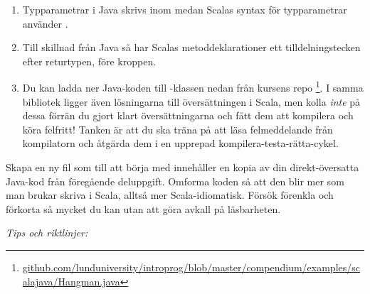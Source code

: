 \begin{enumerate}[noitemsep]
\item Typparametrar i Java skrivs inom \code{<>} medan Scalas syntax för typparametrar använder \code{[]}.

\item Till skillnad från Java så har Scalas metoddeklarationer ett tilldelningstecken \code{=} efter returtypen, före kroppen.

\item Du kan ladda ner Java-koden till -klassen nedan från kursens repo%
\footnote{\href{https://github.com/lunduniversity/introprog/blob/master/compendium/examples/scalajava/Hangman.java}{github.com/lunduniversity/introprog/blob/master/compendium/examples/scalajava/Hangman.java}}. I samma bibliotek ligger även lösningarna till översättningen i Scala, men kolla \emph{inte} på dessa förrän du gjort klart översättningarna och fått dem att kompilera och köra felfritt! Tanken är att du ska träna på att läsa felmeddelande från kompilatorn och åtgärda dem i en upprepad kompilera-testa-rätta-cykel.

\end{enumerate}







\Subtask Skapa en ny fil  som till att börja med innehåller en kopia av din direkt-översatta Java-kod från föregående deluppgift. Omforma koden så att den blir mer som man brukar skriva i Scala, alltså mer Scala-idiomatisk. Försök förenkla och förkorta så mycket du kan utan att göra avkall på läsbarheten.

\emph{Tips och riktlinjer:}


